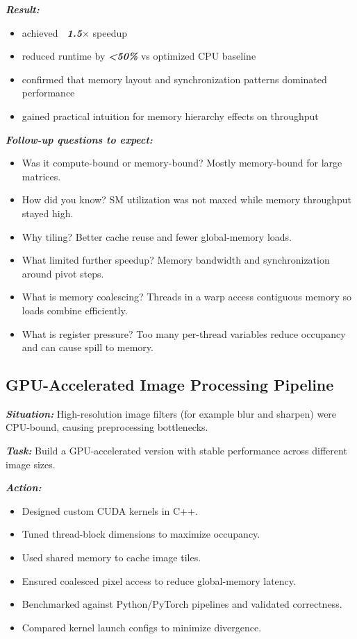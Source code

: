 \documentclass[12pt]{article}
\let\origtextbf\textbf
\renewcommand{\textbf}[1]{\origtextbf{\textit{#1}}}
\begin{document}
\textbf{Result:}
\begin{itemize}
\item achieved \textbf{~1.5\(\times\)} speedup
\item reduced runtime by \textbf{<50\%} vs optimized CPU baseline
\item confirmed that memory layout and synchronization patterns dominated performance
\item gained practical intuition for memory hierarchy effects on throughput
\end{itemize}

\textbf{Follow-up questions to expect:}
\begin{itemize}
\item Was it compute-bound or memory-bound? Mostly memory-bound for large matrices.
\item How did you know? SM utilization was not maxed while memory throughput stayed high.
\item Why tiling? Better cache reuse and fewer global-memory loads.
\item What limited further speedup? Memory bandwidth and synchronization around pivot steps.
\item What is memory coalescing? Threads in a warp access contiguous memory so loads combine efficiently.
\item What is register pressure? Too many per-thread variables reduce occupancy and can cause spill to memory.
\end{itemize}

\subsection{GPU-Accelerated Image Processing Pipeline}
\textbf{Situation:}
High-resolution image filters (for example blur and sharpen) were CPU-bound, causing preprocessing bottlenecks.

\textbf{Task:}
Build a GPU-accelerated version with stable performance across different image sizes.

\textbf{Action:}
\begin{itemize}
\item Designed custom CUDA kernels in C++.
\item Tuned thread-block dimensions to maximize occupancy.
\item Used shared memory to cache image tiles.
\item Ensured coalesced pixel access to reduce global-memory latency.
\item Benchmarked against Python/PyTorch pipelines and validated correctness.
\item Compared kernel launch configs to minimize divergence.
\end{itemize}
\end{document}
